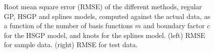 \documentclass[]{interact}
\theoremstyle{plain}%
\theoremstyle{definition}
\theoremstyle{remark}
\begin{document}
\begin{figure}
\caption{Root mean square error (RMSE) of the different methods, regular GP, HSGP and splines models, computed against the actual data, as a function of the number of basis functions $m$ and boundary factor $c$ for the HSGP model, and knots for the splines model. (left) RMSE for sample data. (right) RMSE for test data.}
  \label{fig14_MSE_train_gaydata}
\end{figure}
\end{document}
